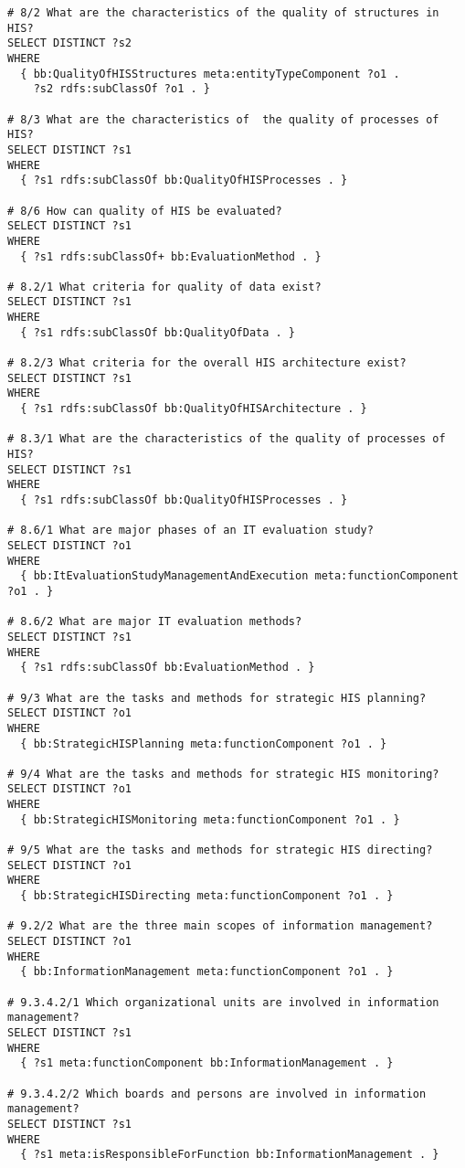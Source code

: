 \begin{lstlisting}[language=SPARQL]
# 8/2 What are the characteristics of the quality of structures in HIS?
SELECT DISTINCT ?s2
WHERE
  { bb:QualityOfHISStructures meta:entityTypeComponent ?o1 .
    ?s2 rdfs:subClassOf ?o1 . }

# 8/3 What are the characteristics of  the quality of processes of HIS?
SELECT DISTINCT ?s1
WHERE
  { ?s1 rdfs:subClassOf bb:QualityOfHISProcesses . }

# 8/6 How can quality of HIS be evaluated?
SELECT DISTINCT ?s1
WHERE
  { ?s1 rdfs:subClassOf+ bb:EvaluationMethod . }

# 8.2/1 What criteria for quality of data exist?
SELECT DISTINCT ?s1
WHERE
  { ?s1 rdfs:subClassOf bb:QualityOfData . }

# 8.2/3 What criteria for the overall HIS architecture exist?
SELECT DISTINCT ?s1
WHERE
  { ?s1 rdfs:subClassOf bb:QualityOfHISArchitecture . }

# 8.3/1 What are the characteristics of the quality of processes of HIS?
SELECT DISTINCT ?s1
WHERE
  { ?s1 rdfs:subClassOf bb:QualityOfHISProcesses . }

# 8.6/1 What are major phases of an IT evaluation study?
SELECT DISTINCT ?o1
WHERE
  { bb:ItEvaluationStudyManagementAndExecution meta:functionComponent ?o1 . }

# 8.6/2 What are major IT evaluation methods?
SELECT DISTINCT ?s1
WHERE
  { ?s1 rdfs:subClassOf bb:EvaluationMethod . }

# 9/3 What are the tasks and methods for strategic HIS planning?
SELECT DISTINCT ?o1
WHERE
  { bb:StrategicHISPlanning meta:functionComponent ?o1 . }

# 9/4 What are the tasks and methods for strategic HIS monitoring?
SELECT DISTINCT ?o1
WHERE
  { bb:StrategicHISMonitoring meta:functionComponent ?o1 . }

# 9/5 What are the tasks and methods for strategic HIS directing?
SELECT DISTINCT ?o1
WHERE
  { bb:StrategicHISDirecting meta:functionComponent ?o1 . }

# 9.2/2 What are the three main scopes of information management?
SELECT DISTINCT ?o1
WHERE
  { bb:InformationManagement meta:functionComponent ?o1 . }

# 9.3.4.2/1 Which organizational units are involved in information management?
SELECT DISTINCT ?s1
WHERE
  { ?s1 meta:functionComponent bb:InformationManagement . }

# 9.3.4.2/2 Which boards and persons are involved in information management?
SELECT DISTINCT ?s1
WHERE
  { ?s1 meta:isResponsibleForFunction bb:InformationManagement . }


\end{lstlisting}
